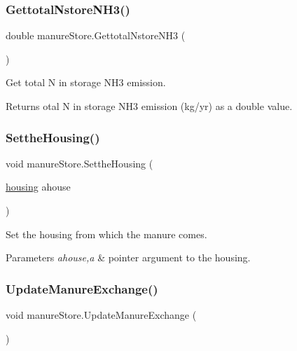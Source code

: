 \subsubsection{\texorpdfstring{GettotalNstoreNH3()}{GettotalNstoreNH3()}}
{\footnotesize\ttfamily double manure\+Store.\+Gettotal\+Nstore\+N\+H3 (\begin{DoxyParamCaption}{ }\end{DoxyParamCaption})\hspace{0.3cm}{\ttfamily [inline]}}



Get total N in storage N\+H3 emission. 

\begin{DoxyReturn}{Returns}
otal N in storage N\+H3 emission (kg/yr) as a double value. 
\end{DoxyReturn}
\mbox{\label{classmanure_store_a12a1c24ccbb83a3bb556202613d2971c}} 
\subsubsection{\texorpdfstring{SettheHousing()}{SettheHousing()}}
{\footnotesize\ttfamily void manure\+Store.\+Setthe\+Housing (\begin{DoxyParamCaption}\item[{\mbox{\hyperlink{classhousing}{housing}}}]{ahouse }\end{DoxyParamCaption})\hspace{0.3cm}{\ttfamily [inline]}}



Set the housing from which the manure comes. 


\begin{DoxyParams}{Parameters}
{\em ahouse,a} & pointer argument to the housing. \\
\hline
\end{DoxyParams}
\mbox{\label{classmanure_store_a2018264038e021dc1bd770557587f468}} 
\subsubsection{\texorpdfstring{UpdateManureExchange()}{UpdateManureExchange()}}
{\footnotesize\ttfamily void manure\+Store.\+Update\+Manure\+Exchange (\begin{DoxyParamCaption}{ }\end{DoxyParamCaption})\hspace{0.3cm}{\ttfamily [inline]}}



